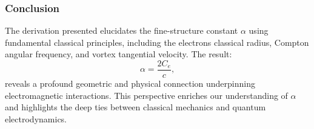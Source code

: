 \subsubsection*{Conclusion}
The derivation presented elucidates the fine-structure constant $\alpha$ using fundamental classical principles, including the electron\rqs s classical radius, Compton angular frequency, and vortex tangential velocity. The result:
\begin{equation*}
    \alpha = \frac{2 C_e}{c},
\end{equation*}
reveals a profound geometric and physical connection underpinning electromagnetic interactions.
This perspective enriches our understanding of $\alpha$ and highlights the deep ties between classical mechanics and quantum electrodynamics.